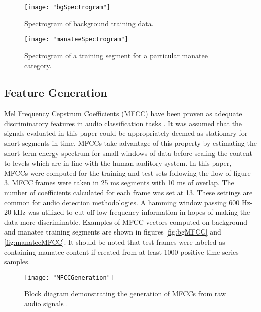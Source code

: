 \documentclass[conference]{IEEEtran}
\begin{document}
\begin{center}
	\begin{figure}[h]
		\centering
		\texttt{[image: "bgSpectrogram"]}
		\caption{Spectrogram of background training data.}
		\label{fig:bgSpectrogram}
	\end{figure}
\end{center}

\begin{center}
	\begin{figure}[h]
		\centering
		\texttt{[image: "manateeSpectrogram"]}
		\caption{Spectrogram of a training segment for a particular manatee category.}
		\label{fig:manateeSpectrogram}
	\end{figure}
\end{center}
	

	\vspace{-3cm}
	\subsection{Feature Generation}
	
	Mel Frequency Cepstrum Coefficients (MFCC) have been proven as adequate discriminatory features in audio classification tasks \cite{Birds,MFCCSpeakerRecognitioin,MFCCVectorQuant,RealTimeMFCC,WienerFiltMFCC,ChoosingMFCC,MFCCSlides}. It was assumed that the signals evaluated in this paper could be appropriately deemed as stationary for short segments in time.   MFCCs take advantage of this property by estimating the short-term energy spectrum for small windows of data before scaling the content to levels which are in line with the human auditory system.  In this paper, MFCCs were computed for the training and test sets following the flow of figure \ref{fig:MFCCGeneration}.  MFCC frames were taken in 25 ms segments with 10 ms of overlap. The number of coefficients calculated for each frame was set at 13.  These settings are common for audio detection methodologies. A hamming window passing 600 Hz-20 kHz was utilized to cut off low-frequency information in hopes of making the data more discriminable.  Examples of MFCC vectors computed on background and manatee training segments are shown in figures \ref{fig:bgMFCC} and \ref{fig:manateeMFCC}.  It should be noted that test frames were labeled as containing manatee content if created from at least 1000 positive time series samples.  
	
	\begin{center}
		\begin{figure}[]
			\centering
			\texttt{[image: "MFCCGeneration"]}
			\caption{Block diagram demonstrating the generation of MFCCs from raw audio signals \cite{WienerFiltMFCC}.}
			\label{fig:MFCCGeneration}
		\end{figure}
	\end{center}
\end{document}
